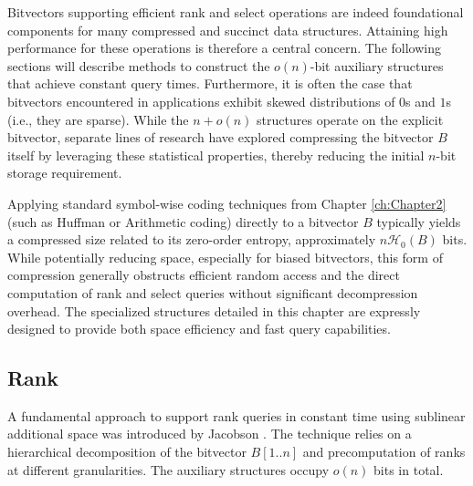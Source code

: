 Bitvectors supporting efficient \textsf{rank} and \textsf{select} operations are indeed foundational components for many compressed and succinct data structures. Attaining high performance for these operations is therefore a central concern. The following sections will describe methods to construct the $o(n)$-bit auxiliary structures that achieve constant query times. Furthermore, it is often the case that bitvectors encountered in applications exhibit skewed distributions of $0$s and $1$s (i.e., they are sparse). While the $n+o(n)$ structures operate on the explicit bitvector, separate lines of research have explored compressing the bitvector $B$ itself by leveraging these statistical properties, thereby reducing the initial $n$-bit storage requirement.


\begin{remark}
    Applying standard symbol-wise coding techniques from Chapter \ref{ch:Chapter2} (such as Huffman or Arithmetic coding) directly to a bitvector $B$ typically yields a compressed size related to its zero-order entropy, approximately $n\mathcal{H}_0(B)$ bits. While potentially reducing space, especially for biased bitvectors, this form of compression generally obstructs efficient random access and the direct computation of \textsf{rank} and \textsf{select} queries without significant decompression overhead. The specialized structures detailed in this chapter are expressly designed to provide both space efficiency and fast query capabilities.
\end{remark}

\subsection{\textsf{Rank}} \label{subsec:rank}

A fundamental approach to support \textsf{rank} queries in constant time using sublinear additional space was introduced by Jacobson \cite{jacobson1988succinct}. The technique relies on a hierarchical decomposition of the bitvector $B[1..n]$ and precomputation of ranks at different granularities. The auxiliary structures occupy $o(n)$ bits in total.

